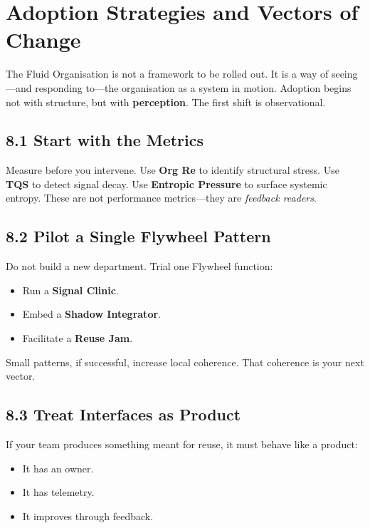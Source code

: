 \documentclass[12pt]{article}
\begin{document}
\section{Adoption Strategies and Vectors of Change}

The Fluid Organisation is not a framework to be rolled out. It is a way of seeing—and responding to—the organisation as a system in motion. Adoption begins not with structure, but with \textbf{perception}. The first shift is observational.

\subsection*{8.1 Start with the Metrics}

Measure before you intervene. Use \textbf{Org Re} to identify structural stress. Use \textbf{TQS} to detect signal decay. Use \textbf{Entropic Pressure} to surface systemic entropy. These are not performance metrics—they are \textit{feedback readers}.

\subsection*{8.2 Pilot a Single Flywheel Pattern}

Do not build a new department. Trial one Flywheel function:
\begin{itemize}
    \item Run a \textbf{Signal Clinic}.
    \item Embed a \textbf{Shadow Integrator}.
    \item Facilitate a \textbf{Reuse Jam}.
\end{itemize}

Small patterns, if successful, increase local coherence. That coherence is your next vector.

\subsection*{8.3 Treat Interfaces as Product}

If your team produces something meant for reuse, it must behave like a product:
\begin{itemize}
    \item It has an owner.
    \item It has telemetry.
    \item It improves through feedback.
\end{itemize}
\end{document}
